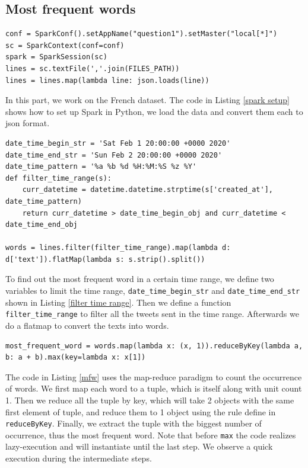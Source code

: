 \subsection{Most frequent words}

\begin{lstlisting}[caption=Python Spark setup, label={spark setup}]
conf = SparkConf().setAppName("question1").setMaster("local[*]")
sc = SparkContext(conf=conf)
spark = SparkSession(sc)
lines = sc.textFile(','.join(FILES_PATH))
lines = lines.map(lambda line: json.loads(line))
\end{lstlisting}


In this part, we work on the French dataset. The code in Listing \ref{spark setup} shows how to set up Spark in Python, we load the data and convert them each to json format.

\begin{lstlisting}[caption=Filtering time range, label={filter time range}]
date_time_begin_str = 'Sat Feb 1 20:00:00 +0000 2020'
date_time_end_str = 'Sun Feb 2 20:00:00 +0000 2020'
date_time_pattern = '%a %b %d %H:%M:%S %z %Y'
def filter_time_range(s):
    curr_datetime = datetime.datetime.strptime(s['created_at'], date_time_pattern)
    return curr_datetime > date_time_begin_obj and curr_datetime < date_time_end_obj

words = lines.filter(filter_time_range).map(lambda d: d['text']).flatMap(lambda s: s.strip().split())
\end{lstlisting}

To find out the most frequent word in a certain time range, we define two variables to limit the time range, \texttt{date\_time\_begin\_str} and \texttt{date\_time\_end\_str} shown in Listing \ref{filter time range}. Then we define a function \texttt{filter\_time\_range} to filter all the tweets sent in the time range. Afterwards we do a flatmap to convert the texts into words.

\begin{lstlisting}[caption=Most frequent word, label={mfw}]
most_frequent_word = words.map(lambda x: (x, 1)).reduceByKey(lambda a, b: a + b).max(key=lambda x: x[1])
\end{lstlisting}

The code in Listing \ref{mfw} uses the map-reduce paradigm to count the occurrence of words. We first map each word to a tuple, which is itself along with unit count 1. Then we reduce all the tuple by key, which will take 2 objects with the same first element of tuple, and reduce them to 1 object using the rule define in \texttt{reduceByKey}. Finally, we extract the tuple with the biggest number of occurrence, thus the most frequent word. Note that before \texttt{max} the code realizes lazy-execution and will instantiate until the last step. We observe a quick execution during the intermediate steps.

